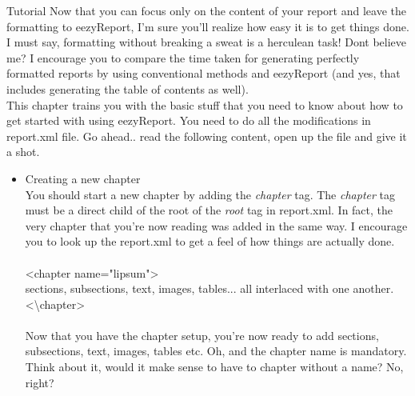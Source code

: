 \documentclass{report}
\begin{document}
\begin{projChapter}{Tutorial}
        Now that you can focus only on the content of your report and leave the formatting to eezyReport, I'm sure you'll realize how easy it is to get things done. I must say, formatting without breaking a sweat is a herculean task! Dont believe me? I encourage you to compare the time taken for generating perfectly formatted reports by using conventional methods and eezyReport (and yes, that includes generating the table of contents as well).
        ~\\ 
        This chapter trains you with the basic stuff that you need to know about how to get started with using eezyReport. You need to do all the modifications in report.xml file. Go ahead.. read the following content, open up the file and give it a shot.        
        
\begin{itemize}
  \item Creating a new chapter
                ~\\ You should start a new chapter by adding the \textit{chapter} tag. The \textit{chapter} tag must be a direct child of the root of the \textit{root} tag in report.xml. In fact, the very chapter that you're now reading was added in the same way. I encourage you to look up the report.xml to get a feel of how things are actually done.
                ~\\
                ~\\
                \textless chapter name="lipsum"\textgreater 
                ~\\
                sections, subsections, text, images, tables... all interlaced with one another.
                ~\\
                \textless \textbackslash chapter\textgreater 
                ~\\\\
                Now that you have the chapter setup, you're now ready to add sections, subsections, text, images, tables etc. Oh, and the chapter name is mandatory. Think about it, would it make sense to have to chapter without a name? No, right?
            

\end{itemize}
\end{projChapter}
\end{document}
